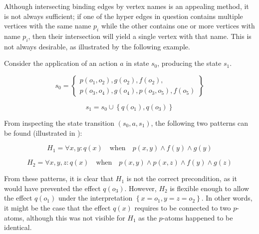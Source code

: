\documentclass[../Master.tex]{subfiles}
\begin{document}
Although intersecting binding edges by vertex names is an appealing method, it is not always sufficient; if one of the hyper edges in question contains multiple vertices with the same name $p_i$ while the other contains one or more vertices with name $p_i$, then their intersection will yield a single vertex with that name. This is not always desirable, as illustrated by the following example.

\begin{example} \label{ex:ca:hgma:generalization}
	Consider the application of an action $a$ in state $s_0$, producing the state $s_1$.

	\begin{equation*}
		s_0 = \left\{
			\begin{gathered}
				p(o_1, o_2), g(o_2), f(o_2), \\
				p(o_3, o_4), g(o_4), p(o_3, o_5), f(o_5)
			\end{gathered}
		\right\}
	\end{equation*}

	\begin{equation*}
		s_1 = s_0 \cup \left\{ q\left( o_1 \right), q \left( o_3 \right) \right\}
	\end{equation*}

	From inspecting the state transition $\left( s_0, a, s_1 \right)$, the following two patterns can be found (illustrated in ):

    \begin{equation*}
        H_1 = \forall x, y : q(x) \quad \text{when} \quad
            p(x,y) \land f(y) \land g(y)
    \end{equation*}

    \begin{equation*}
        H_2 = \forall x, y, z : q(x) \quad \text{when} \quad
            p(x, y) \land p(x,z) \land f(y) \land g(z)
    \end{equation*}

	From these patterns, it is clear that $H_1$ is not the correct precondition, as it would have prevented the effect $q\left(o_3\right)$. However, $H_2$ is flexible enough to allow the effect $q\left(o_1\right)$ under the interpretation $\left\{ x = o_1, y = z = o_2 \right\}$. In other words, it might be the case that the effect $q(x)$ requires to be connected to two $p$-atoms, although this was not visible for $H_1$ as the $p$-atoms happened to be identical.


\end{example}
\end{document}
